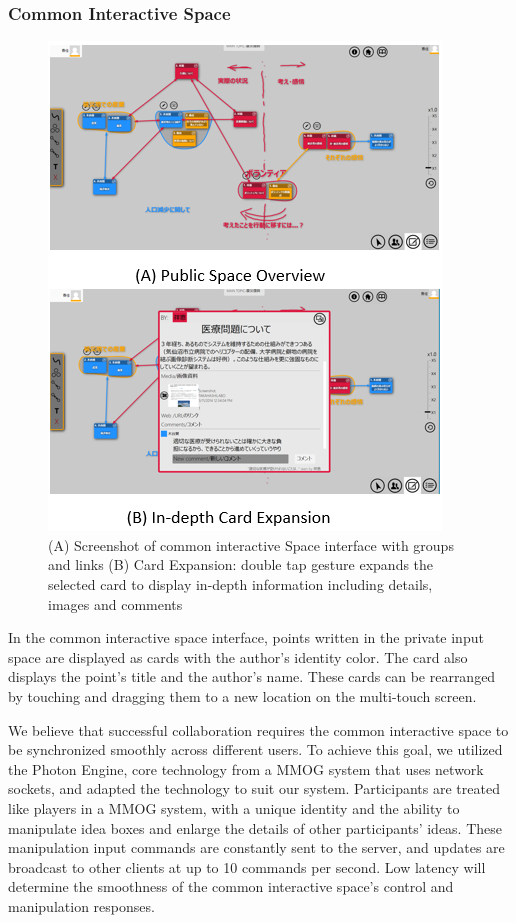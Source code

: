 \documentclass{sigchi}
\begin{document}
\subsubsection{Common Interactive Space}

\begin{figure}[!h]
\centering
\includegraphics[width=1.0\columnwidth]{public4}
\caption{(A) Screenshot of common interactive Space interface with groups and links (B) Card Expansion: double tap gesture expands the selected card to display in-depth information including details, images and comments}
\label{fig:figure1}
\end{figure}
In the common interactive space interface, points written in the private input space are displayed as cards with the author's identity color. The card also displays the point's title and the author's name. These cards can be rearranged by touching and dragging them to a new location on the multi-touch screen.

We believe that successful collaboration requires the common interactive  space to be synchronized smoothly across different users. To achieve this goal, we utilized the Photon Engine, core technology from a MMOG system that uses network sockets, and adapted the technology to suit our system. Participants are treated like players in a MMOG system, with a unique identity and the ability to manipulate idea boxes and enlarge the details of other participants' ideas. These manipulation input commands are constantly sent to the server, and updates are broadcast to other clients at up to 10 commands per second.  Low latency will determine the smoothness of the common interactive  space's control and manipulation responses. 
\end{document}

